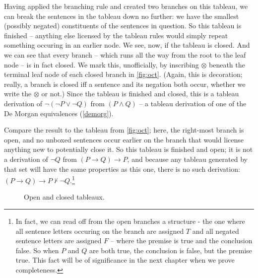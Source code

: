  Having applied the branching rule and created two branches on this tableau, we can break the sentences in the tableau down no further: we have the smallest (possibly negated) constituents of the sentences in question. So this tableau is finished – anything else licensed by the tableau rules would simply repeat something occuring in an earlier node. We see, now, if the tableau is closed. And we can see that every  branch – which runs all the way from the root to the leaf node – is in fact closed. We mark this, unofficially, by inscribing $\mathbf{\otimes}$ beneath the terminal leaf node of each closed branch in \autoref{fig:oct}. (Again, this is decoration; really, a branch is closed iff a sentence and its negation both occur, whether we write the $\mathbf{\otimes}$ or not.) Since the tableau is finished and closed, this is a tableau derivation of $¬(¬P \vee ¬Q)$ from $(P \wedge Q)$ – a tableau derivation of one of the De Morgan equivalences (\autoref{demorg}).

 Compare the result to the tableau from \autoref{fig:oct}; here, the right-most branch is open, and no unboxed sentences occur earlier on the branch that would license anything new to potentially close it. So this tableau is finished and open; it is not a derivation of $¬Q$ from $(P \to Q) \to P$, and because any tableau generated by that set will have the same properties as this one, there is no such derivation: $(P \to Q) \to P \nvdash ¬Q$.\footnote{In fact, we can read off from the open branches a structure - the one where all sentence letters occuring on the branch are assigned $T$ and all negated sentence letters are assigned $F$ – where the premise is true and the conclusion false. So when $P$ and $Q$ are both true, the conclusion is false, but the premise true. This fact will be of significance in the next chapter when we prove completeness.}  

\begin{figure}
    \centering
{}\qquad
    \caption{Open and closed tableaux. \label{fig:oct}}
 
\end{figure}

